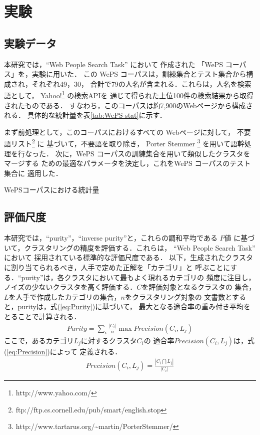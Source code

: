 \documentclass[japanese]{jnlp_1.4}
\begin{document}
\section{実験}
\label{sec:Experiments}

\subsection{実験データ}
\label{subsec:ExperimentalData}

本研究では，``Web People Search Task'' \cite{Artiles07} において
作成された 「WePS コーパス」を，実験に用いた．
この WePS コーパスは，訓練集合とテスト集合から構成され，それぞれ49，30，
合計で79の人名が含まれる．これらは，人名を検索語として，
Yahoo!\footnote{http://www.yahoo.com/} の検索APIを
通じて得られた上位100件の検索結果から取得されたものである．
すなわち，このコーパスは約7,900のWebページから構成される．
具体的な統計量を表\ref{tab:WePS-stat}に示す．

まず前処理として，このコーパスにおけるすべての
Webページに対して，
不要語リスト\footnote{ftp://ftp.cs.cornell.edu/pub/smart/english.stop} に
基づいて，不要語を取り除き，
Porter Stemmer \cite{Porter80}\footnote{http://www.tartarus.org/\~{}martin/PorterStemmer/} を用いて語幹処理を行なった．
次に，WePS コーパスの訓練集合を用いて類似したクラスタをマージする
ための最適なパラメータを決定し，これをWePS コーパスのテスト集合に
適用した．


\begin{table}[t]
 \caption{WePSコーパスにおける統計量} 
\label{tab:WePS-stat}

\end{table}



\subsection{評価尺度}
\label{subsec:EvaluationMeasure}

本研究では，``purity''，``inverse purity''と，これらの調和平均である
$F$値 \cite{Hotho05} に基づいて，クラスタリングの精度を評価する．これらは，
``Web People Search Task'' において
採用されている標準的な評価尺度である．
以下，生成されたクラスタに割り当てられるべき，人手で定めた正解を「カテゴリ」と
呼ぶことにする．``purity''は，各クラスタにおいて最もよく現れるカテゴリの
頻度に注目し，ノイズの少ないクラスタを高く評価する．$C$を評価対象となるクラスタの
集合，$L$を人手で作成したカテゴリの集合，$n$をクラスタリング対象の
文書数とすると，purityは，式(\ref{eq:Purity})に基づいて，
最大となる適合率の重み付き平均をとることで計算される．
\begin{eqnarray}
Purity=\sum_{i}\frac{|C_{i}|}{n}\max Precision(C_{i}, L_{j}) \label{eq:Purity}  
\end{eqnarray}
ここで，あるカテゴリ$L_{j}$に対するクラスタ$C_{i}$の
適合率$Precision(C_{i},L_{j})$は，式(\ref{eq:Precision})によって
定義される．
\begin{eqnarray}
Precision(C_{i},L_{j})=\frac{|C_{i}\bigcap L_{j}|}{|C_{i}|} \label{eq:Precision}
\end{eqnarray}
\end{document}
